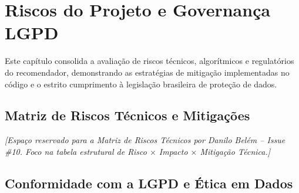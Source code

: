 % 

\section{Riscos do Projeto e Governança LGPD}
\label{sec:riscos_projeto}

Este capítulo consolida a avaliação de riscos técnicos, algorítmicos e regulatórios do recomendador, demonstrando as estratégias de mitigação implementadas no código e o estrito cumprimento à legislação brasileira de proteção de dados.

\subsection{Matriz de Riscos Técnicos e Mitigações}
\label{sec:matriz_riscos}

\noindent\textit{[Espaço reservado para a Matriz de Riscos Técnicos por Danilo Belém -- Issue \#10. Foco na tabela estrutural de Risco $\times$ Impacto $\times$ Mitigação Técnica.]}

\subsection{Conformidade com a LGPD e Ética em Dados}
\label{sec:lgpd_governanca}

